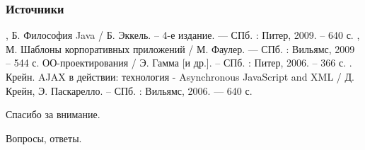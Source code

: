 \documentclass[xcolor=pdftex, dvipsnames, table]{beamer}
\begin{document}
\begin{frame}
  \frametitle{Источники}
  \begin{itemize}
    , Б. Философия Java / Б. Эккель. -- 4-е издание. --- СПб. : Питер, 2009. -- 640 с.
    , М. Шаблоны корпоративных приложений / М. Фаулер. --- СПб. : Вильямс, 2009 -- 544 с.
     ОО-проектирования / Э. Гамма [и др.]. -- СПб. : Питер, 2006. -- 366 с.
    . Крейн. AJAX в действии: технология - Asynchronous JavaScript and XML / Д. Крейн, Э. Паскарелло. -- СПб. : Вильямс, 2006. --- 640 с.
  \end{itemize}

\end{frame}

\begin{frame}
  \begin{center}
    \begin{huge}
      Спасибо за внимание.
    \end{huge}

    Вопросы, ответы.
  \end{center}
\end{frame}
\end{document}
